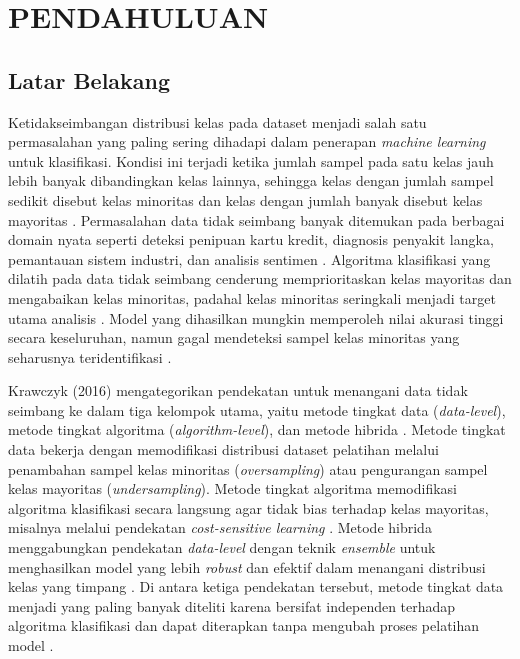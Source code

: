 \newpage
\chapter{PENDAHULUAN} \label{Bab I}

\section{Latar Belakang} \label{I.Latar Belakang}

Ketidakseimbangan distribusi kelas pada dataset menjadi salah satu permasalahan yang paling sering dihadapi dalam penerapan \textit{machine learning} untuk klasifikasi. Kondisi ini terjadi ketika jumlah sampel pada satu kelas jauh lebih banyak dibandingkan kelas lainnya, sehingga kelas dengan jumlah sampel sedikit disebut kelas minoritas dan kelas dengan jumlah banyak disebut kelas mayoritas \cite{He2009Imbalanced}. Permasalahan data tidak seimbang banyak ditemukan pada berbagai domain nyata seperti deteksi penipuan kartu kredit, diagnosis penyakit langka, pemantauan sistem industri, dan analisis sentimen \cite{Krawczyk2016Imbalanced}. Algoritma klasifikasi yang dilatih pada data tidak seimbang cenderung memprioritaskan kelas mayoritas dan mengabaikan kelas minoritas, padahal kelas minoritas seringkali menjadi target utama analisis \cite{Hou2025XGBoost}. Model yang dihasilkan mungkin memperoleh nilai akurasi tinggi secara keseluruhan, namun gagal mendeteksi sampel kelas minoritas yang seharusnya teridentifikasi \cite{VanFC2024Enhancing}.

Krawczyk (2016) mengategorikan pendekatan untuk menangani data tidak seimbang ke dalam tiga kelompok utama, yaitu metode tingkat data (\textit{data-level}), metode tingkat algoritma (\textit{algorithm-level}), dan metode hibrida \cite{Krawczyk2016Imbalanced}. Metode tingkat data bekerja dengan memodifikasi distribusi dataset pelatihan melalui penambahan sampel kelas minoritas (\textit{oversampling}) atau pengurangan sampel kelas mayoritas (\textit{undersampling}). Metode tingkat algoritma memodifikasi algoritma klasifikasi secara langsung agar tidak bias terhadap kelas mayoritas, misalnya melalui pendekatan \textit{cost-sensitive learning} \cite{Krawczyk2016Imbalanced}. Metode hibrida menggabungkan pendekatan \textit{data-level} dengan teknik \textit{ensemble} untuk menghasilkan model yang lebih \textit{robust} dan efektif dalam menangani distribusi kelas yang timpang \cite{Krawczyk2016Imbalanced}. Di antara ketiga pendekatan tersebut, metode tingkat data menjadi yang paling banyak diteliti karena bersifat independen terhadap algoritma klasifikasi dan dapat diterapkan tanpa mengubah proses pelatihan model \cite{He2009Imbalanced}.

